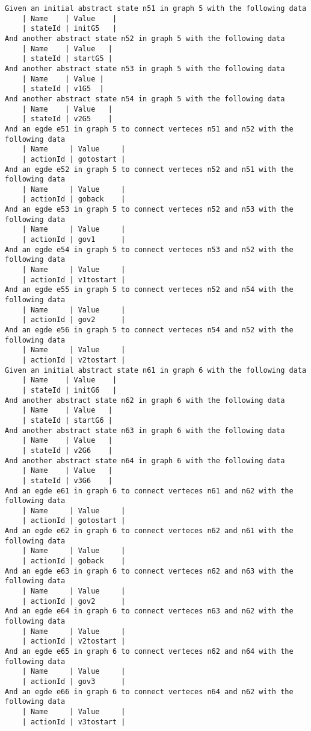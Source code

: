 \begin{lstlisting}[language=Gherkin,  basicstyle=\tiny, caption=Test Scenario's, label=code:gherkin-tests]
Given an initial abstract state n51 in graph 5 with the following data
    | Name    | Value    |
    | stateId | initG5   |
And another abstract state n52 in graph 5 with the following data
    | Name    | Value   |
    | stateId | startG5 |
And another abstract state n53 in graph 5 with the following data
    | Name    | Value |
    | stateId | v1G5  |
And another abstract state n54 in graph 5 with the following data
    | Name    | Value   |
    | stateId | v2G5    |
And an egde e51 in graph 5 to connect verteces n51 and n52 with the following data
    | Name     | Value     |
    | actionId | gotostart |
And an egde e52 in graph 5 to connect verteces n52 and n51 with the following data
    | Name     | Value     |
    | actionId | goback    |
And an egde e53 in graph 5 to connect verteces n52 and n53 with the following data
    | Name     | Value     |
    | actionId | gov1      |
And an egde e54 in graph 5 to connect verteces n53 and n52 with the following data
    | Name     | Value     |
    | actionId | v1tostart |
And an egde e55 in graph 5 to connect verteces n52 and n54 with the following data
    | Name     | Value     |
    | actionId | gov2      |
And an egde e56 in graph 5 to connect verteces n54 and n52 with the following data
    | Name     | Value     |
    | actionId | v2tostart |
Given an initial abstract state n61 in graph 6 with the following data
    | Name    | Value    |
    | stateId | initG6   |
And another abstract state n62 in graph 6 with the following data
    | Name    | Value   |
    | stateId | startG6 |
And another abstract state n63 in graph 6 with the following data
    | Name    | Value   |
    | stateId | v2G6    |
And another abstract state n64 in graph 6 with the following data
    | Name    | Value   |
    | stateId | v3G6    |
And an egde e61 in graph 6 to connect verteces n61 and n62 with the following data
    | Name     | Value     |
    | actionId | gotostart |
And an egde e62 in graph 6 to connect verteces n62 and n61 with the following data
    | Name     | Value     |
    | actionId | goback    |
And an egde e63 in graph 6 to connect verteces n62 and n63 with the following data
    | Name     | Value     |
    | actionId | gov2      |
And an egde e64 in graph 6 to connect verteces n63 and n62 with the following data
    | Name     | Value     |
    | actionId | v2tostart |
And an egde e65 in graph 6 to connect verteces n62 and n64 with the following data
    | Name     | Value     |
    | actionId | gov3      |
And an egde e66 in graph 6 to connect verteces n64 and n62 with the following data
    | Name     | Value     |
    | actionId | v3tostart |


\end{lstlisting}
